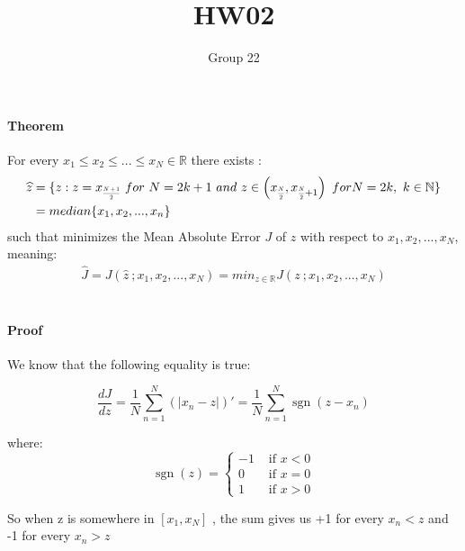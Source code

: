 \documentclass{article}
\title{\Large{HW02}}
\author{Group 22}
\DeclareMathOperator{\sgn}{sgn}
\begin{document}
\maketitle

\paragraph*{Theorem} 
For every $x_{1} \leq x_{2} \leq ...  \leq x_{N} \in \mathbb{R} $ there exists :\\

\begin{align*}
\widehat{z} &=\lbrace z:z =x_{\scaleto{\dfrac{N+1}{2}}{10pt}}~for~N=2k+1 ~ and ~
z\in \left( x_{\scaleto{\dfrac{N}{2}}{10pt}},x_{\scaleto{\dfrac{N}{2}}{10pt} +1} \right)~for N=2k,~k \in \mathbb{N} \rbrace\\
&=median\lbrace x_{1},x_{2},...,x_{n}\rbrace
\end{align*}
such that minimizes the Mean Absolute Error $J$ of $z$ with respect to $x_{1}, x_{2} , ...  ,x_{N}$, meaning:
\begin{align*}
\widehat{J}=J(\widehat{z} ~;x_{1}, x_{2} , ...  ,x_{N})=min_{z \in \mathbb{R}}J(z ~;x_{1}, x_{2} , ...  ,x_{N})
\end{align*}
\\
\vspace{1cm}
\paragraph*{Proof}

We know that the following equality is true:

\[ \frac{dJ}{dz}=\frac{1}{N} \sum_{n=1}^{N}\left(\left |x_n-z\right |\right)'  = \frac{1}{N}\sum_{n=1}^{N}\sgn(z-x_n)\]


\vspace{1cm}
where:
\begin{equation}
    \sgn(z)= 
    \begin{cases}
      -1 &  \text{ if } x < 0 \\
      0  &  \text{ if } x = 0 \\
      1  &  \text{ if } x > 0
    \end{cases}
  \end{equation}



So when z is somewhere in  $[x_{1},x_{N}]$ , the sum gives us
 +1 for every  $x_{n} < z $
and -1 for every  $x_{n} > z$
\end{document}
